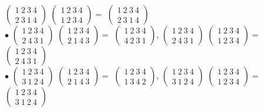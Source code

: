 \documentclass[12pt,a4paper]{scrartcl}
\begin{document}
	$\begin{pmatrix}
	1~2~3~4\\
	2~3~1~4
	\end{pmatrix}$
	$\begin{pmatrix}
	1~2~3~4\\
	1~2~3~4
	\end{pmatrix} = $
	$\begin{pmatrix}
	1~2~3~4\\
	2~3~1~4	\end{pmatrix}$\\
	$\bullet$
	$\begin{pmatrix}
	1~2~3~4\\
	2~4~3~1
	\end{pmatrix}$
	$\begin{pmatrix}
	1~2~3~4\\
	2~1~4~3
	\end{pmatrix} = $ $\begin{pmatrix}
	1~2~3~4\\
	4~2~3~1
	\end{pmatrix}$, 
	$\begin{pmatrix}
	1~2~3~4\\
	2~4~3~1
	\end{pmatrix}$
	$\begin{pmatrix}
	1~2~3~4\\
	1~2~3~4
	\end{pmatrix} = $
	$\begin{pmatrix}
	1~2~3~4\\
	2~4~3~1	\end{pmatrix}$\\
	$\bullet$
	$\begin{pmatrix}
	1~2~3~4\\
	3~1~2~4
	\end{pmatrix}$
	$\begin{pmatrix}
	1~2~3~4\\
	2~1~4~3
	\end{pmatrix} = $ $\begin{pmatrix}
	1~2~3~4\\
	1~3~4~2
	\end{pmatrix}$, 
	$\begin{pmatrix}
	1~2~3~4\\
	3~1~2~4
	\end{pmatrix}$
	$\begin{pmatrix}
	1~2~3~4\\
	1~2~3~4
	\end{pmatrix} = $
	$\begin{pmatrix}
	1~2~3~4\\
	3~1~2~4	\end{pmatrix}$\\
\end{document}
